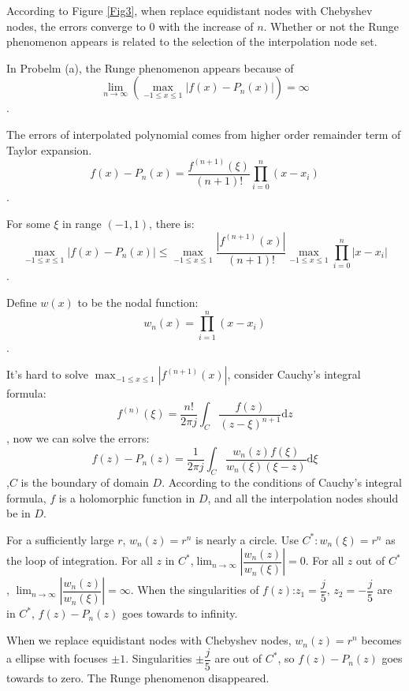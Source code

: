 \documentclass[UTF8,hyperref]{article}
\begin{document}
\par According to Figure \ref{Fig3}, when replace equidistant nodes with Chebyshev nodes, the errors converge to $0$ with the increase of $n$. Whether or not the Runge phenomenon appears is related to the selection of the interpolation node set.

\par In Probelm (a), the Runge phenomenon appears because of 
\begin{equation}
\lim_{n\rightarrow \infty}{(\max_{-1\le x \le 1}{\vert f(x)-P_n(x)\vert })}=\infty
\end{equation}
. 
\par The errors of interpolated polynomial comes from higher order remainder term of Taylor expansion.
\begin{equation}
    f(x)-P_n(x)=\dfrac{f^{(n+1)}(\xi)}{(n+1)!}\prod_{i=0}^{n}(x-x_i)
\end{equation}.
\par For some $\xi$ in range $(-1,1)$, there is:
\begin{equation}
    \max_{-1\le x \le 1}{|f(x)-P_n(x)|}\le \max_{-1\le x \le 1}{\dfrac{|f^{(n+1)}(x)|}{(n+1)!}}\max_{-1 \le x\le 1}{\prod_{i=0}^{n}{|x-x_i|}}
\end{equation}.
\par Define $w(x)$ to be the nodal function:
\begin{equation}
    w_n(x)=\prod_{i=1}^{n}{(x-x_i)}
\end{equation}
.
\par It's hard to solve $\displaystyle \max_{-1\le x \le 1}{|f^{(n+1)}(x)|}$, consider Cauchy's integral formula:
\begin{equation}
    f^{(n)}(\xi)=\dfrac{n!}{2\pi j}{\int_C{\dfrac{f(z)}{(z-\xi)^{n+1}}}\mathrm{d}z}
\end{equation}, now we can solve the errors:
\begin{equation}
    f(z)-P_n(z)=\dfrac{1}{2\pi j}{\int_C{\dfrac{w_n(z)f(\xi)}{w_n(\xi)(\xi-z)}}\mathrm{d}\xi}
\end{equation}
,$C$ is the boundary of domain $D$. According to the conditions of Cauchy's integral formula, $f$ is a holomorphic function in $D$, and all the interpolation nodes should be in $D$.
\par For a sufficiently large $r$, $w_n(z)=r^n$ is nearly a circle. Use $C^*:w_n(\xi)=r^n$ as the loop of integration. For all $z$ in $C^*$,$\displaystyle \lim_{n\rightarrow\infty}{|\dfrac{w_n(z)}{w_n(\xi)}|}=0$. For all $z$ out of $C^*$, $\displaystyle \lim_{n\rightarrow\infty}{|\dfrac{w_n(z)}{w_n(\xi)}|}=\infty$. When the singularities of $f(z)$:$z_1=\dfrac{j}{5},\,z_2=-\dfrac{j}{5}$ are in $C^*$, $f(z)-P_n(z)$ goes towards to infinity.
\par When we replace equidistant nodes with Chebyshev nodes, $w_n(z)=r^n$ becomes a ellipse with focuses $\pm 1$. Singularities $\pm \dfrac{j}{5}$ are out of $C^*$, so $f(z)-P_n(z)$ goes towards to zero. The Runge phenomenon disappeared.
\end{document}
